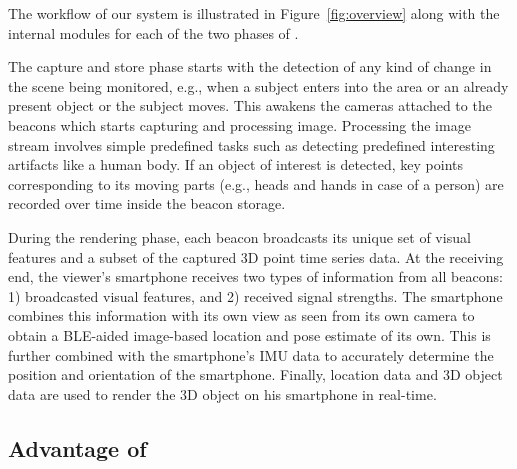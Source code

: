 The workflow of our system is illustrated in Figure~\ref{fig:overview} along with the internal modules for each of the two phases of \Sys.

The capture and store phase starts with the detection of any kind of change in the scene being monitored, e.g., when a subject enters into the area or an already present object or the subject moves. This awakens the cameras attached to the beacons which starts capturing and processing image. Processing the image stream involves simple predefined tasks such as detecting predefined interesting artifacts like a human body. If an object of interest is detected, key points corresponding to its moving parts (e.g., heads and hands in case of a person) are recorded over time inside the beacon storage.


During the rendering phase, each beacon broadcasts its unique set of visual features and a subset of the captured 3D point time series data. At the receiving end, the viewer's smartphone receives two types of information from all beacons: 1) broadcasted visual features, and 2) received signal strengths. The smartphone combines this information with its own view as seen from its own camera to obtain a BLE-aided image-based location and pose estimate of its own. This is further combined with the smartphone's IMU data to accurately determine the position and orientation of the smartphone. Finally, location data and 3D object data are used to render the 3D object on his smartphone in real-time.


\subsection{Advantage of \Sys}

